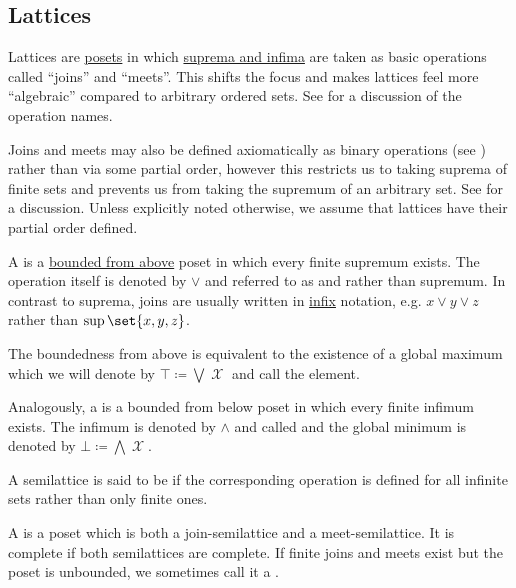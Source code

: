 \subsection{Lattices}\label{subsec:lattices}

\begin{definition}\label{def:semilattice}
  Lattices are \hyperref[def:poset]{posets} in which \hyperref[def:preordered_set/supremum_and_infimum]{suprema and infima} are taken as basic operations called \enquote{joins} and \enquote{meets}. This shifts the focus and makes lattices feel more \enquote{algebraic} compared to arbitrary ordered sets. See  for a discussion of the operation names.

  Joins and meets may also be defined axiomatically as binary operations (see ) rather than via some partial order, however this restricts us to taking suprema of finite sets and prevents us from taking the supremum of an arbitrary set. See  for a discussion. Unless explicitly noted otherwise, we assume that lattices have their partial order defined.

  \begin{thmenum}[series=def:semilattice]
     A  is a \hyperref[def:preordered_set/bounded_set]{bounded from above} poset in which every finite supremum exists. The operation itself is denoted by \( \vee \) and referred to as  and rather than supremum. In contrast to suprema, joins are usually written in \hyperref[rem:order_infix_notation]{infix} notation, e.g. \( x \vee y \vee z \) rather than \( \sup\set{ x, y, z } \).

    The boundedness from above is equivalent to the existence of a global maximum which we will denote by \( \top \coloneqq \bigvee \mscrX \) and call the  element.

     Analogously, a  is a bounded from below poset in which every finite infimum exists. The infimum is denoted by \( \wedge \) and called  and the global minimum is denoted by \( \bot \coloneqq \bigwedge \mscrX \).

     A semilattice is said to be  if the corresponding operation is defined for all infinite sets rather than only finite ones.

     A  is a poset which is both a join-semilattice and a meet-semilattice. It is complete if both semilattices are complete. If finite joins and meets exist but the poset is unbounded, we sometimes call it a .


\end{thmenum}
\end{definition}
